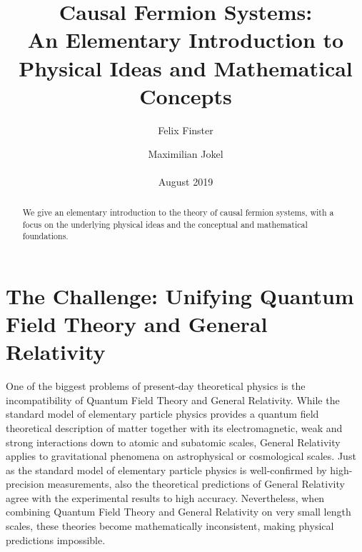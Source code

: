 \documentclass[reqno,11pt]{amsart}
\title[{An Elementary Introduction to Causal Fermion Systems}]{Causal Fermion Systems: \\
An Elementary Introduction to \\ Physical Ideas and Mathematical Concepts}
\author[F.\ Finster]{Felix Finster}
\author[M.\ Jokel]{Maximilian Jokel \\ \\ August 2019}
\numberwithin{equation}{section}
\newcommand{\1}{\mbox{\rm 1 \hspace{-1.05 em} 1}}
\begin{document}
\maketitle

\begin{abstract}
We give an elementary introduction to the theory of causal fermion systems,
with a focus on the underlying physical ideas and the conceptual and mathematical foundations.
\end{abstract} 

\tableofcontents


\section[Unifying Quantum Field Theory and General Relativity]{The Challenge: Unifying Quantum Field Theory and General Relativity}
One of the biggest problems of present-day theoretical physics is the incompatibility of Quantum Field Theory and General Relativity. While the standard model of elementary particle physics provides a
quantum field theoretical description of matter together with its electromagnetic, weak and strong interactions 
down to atomic and subatomic scales,
General Relativity applies to gravitational phenomena on astrophysical or cosmological scales. Just as the standard model of elementary particle physics is well-confirmed by high-precision measurements, also the theoretical predictions of General Relativity agree with the experimental results to high accuracy.
Nevertheless, when combining Quantum Field Theory and General Relativity on very small length scales,
these theories become mathematically inconsistent, making physical predictions impossible.
\end{document}
